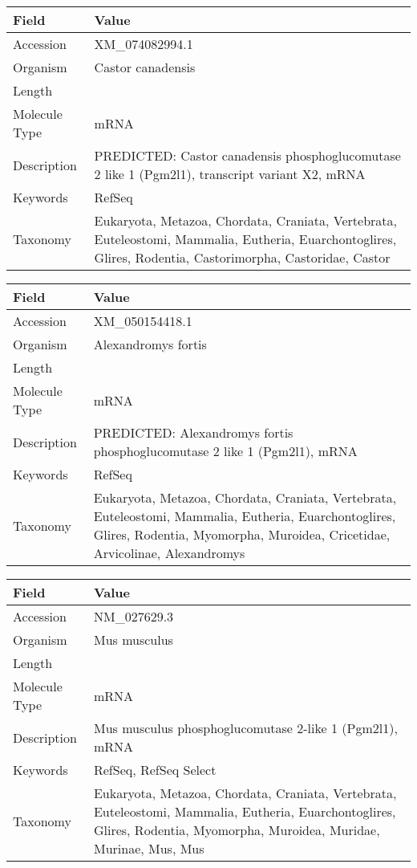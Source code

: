 \documentclass[10pt]{article}
\begin{document}
{\footnotesize
\begin{longtable}{>{\raggedright\arraybackslash}p{4.5cm} >{\raggedright\arraybackslash}p{11.5cm}}
\textbf{Field} & \textbf{Value} \\
\hline
Accession & XM\_074082994.1 \\
Organism & Castor canadensis \\
Length & 8232 \\
Molecule Type & mRNA \\
Description & PREDICTED: Castor canadensis phosphoglucomutase 2 like 1 (Pgm2l1), transcript variant X2, mRNA \\
Keywords & RefSeq \\
Taxonomy & Eukaryota, Metazoa, Chordata, Craniata, Vertebrata, Euteleostomi, Mammalia, Eutheria, Euarchontoglires, Glires, Rodentia, Castorimorpha, Castoridae, Castor \\
\end{longtable}
}

{\footnotesize
\begin{longtable}{>{\raggedright\arraybackslash}p{4.5cm} >{\raggedright\arraybackslash}p{11.5cm}}
\textbf{Field} & \textbf{Value} \\
\hline
Accession & XM\_050154418.1 \\
Organism & Alexandromys fortis \\
Length & 4327 \\
Molecule Type & mRNA \\
Description & PREDICTED: Alexandromys fortis phosphoglucomutase 2 like 1 (Pgm2l1), mRNA \\
Keywords & RefSeq \\
Taxonomy & Eukaryota, Metazoa, Chordata, Craniata, Vertebrata, Euteleostomi, Mammalia, Eutheria, Euarchontoglires, Glires, Rodentia, Myomorpha, Muroidea, Cricetidae, Arvicolinae, Alexandromys \\
\end{longtable}
}

{\footnotesize
\begin{longtable}{>{\raggedright\arraybackslash}p{4.5cm} >{\raggedright\arraybackslash}p{11.5cm}}
\textbf{Field} & \textbf{Value} \\
\hline
Accession & NM\_027629.3 \\
Organism & Mus musculus \\
Length & 8641 \\
Molecule Type & mRNA \\
Description & Mus musculus phosphoglucomutase 2-like 1 (Pgm2l1), mRNA \\
Keywords & RefSeq, RefSeq Select \\
Taxonomy & Eukaryota, Metazoa, Chordata, Craniata, Vertebrata, Euteleostomi, Mammalia, Eutheria, Euarchontoglires, Glires, Rodentia, Myomorpha, Muroidea, Muridae, Murinae, Mus, Mus \\
\end{longtable}
}
\end{document}
